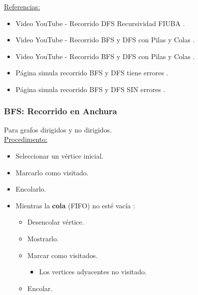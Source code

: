 \documentclass[../main.tex]{subfiles}
\begin{document}
            \underline{Referencias:}
            \begin{itemize}
                \item Video YouTube - Recorrido DFS Recursividad FIUBA \cite{grafo_dfs_recursividad_youtube}.
                \item Video YouTube - Recorrido BFS y DFS con Pilas y Colas  \cite{grafo_bfs_dfs_youtube_1}.
                \item Video YouTube - Recorrido BFS y DFS con Pilas y Colas  \cite{grafo_bfs_dfs_youtube_2}.
                \item Página simula recorrido BFS y DFS tiene errores \cite{grafo_bfs_dfs_simulacion_1}.
                \item Página simula recorrido BFS y DFS SIN errores \cite{grafo_bfs_dfs_simulacion_2}.
            \end{itemize}


            \subsubsection{BFS: Recorrido en Anchura}
                Para grafos dirigidos y no dirigidos.\\
                
                \underline{Procedimento:}
                \begin{itemize}
                    \item Seleccionar un vértice inicial.
                    \item Marcarlo como visitado.
                    \item Encolarlo.
                    \item Mientras la \textbf{cola} (FIFO) no esté vacía :
                        \begin{itemize}
                            \item Desencolar vértice.
                            \item Mostrarlo.
                            \item Marcar como visitados.
                                \begin{itemize}
                                    \item Los vertices adyacentes no visitado.
                                \end{itemize}
                                \item Encolar.
                        \end{itemize}

                \end{itemize}
\end{document}
